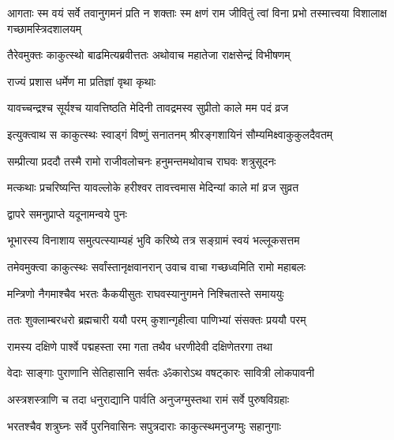 \threelineshloka
{आगताः स्म वयं सर्वे तवानुगमनं प्रति}
{न शक्ताः स्म क्षणं राम जीवितुं त्वां विना प्रभो}
{तस्मात्त्वया विशालाक्ष गच्छामस्त्रिदशालयम्}%


\twolineshloka
{तैरेवमुक्तः काकुत्स्थो बाढमित्यब्रवीत्ततः}
{अथोवाच महातेजा राक्षसेन्द्रं विभीषणम्}%


राज्यं प्रशास धर्मेण मा प्रतिज्ञां वृथा कृथाः

\twolineshloka
{यावच्चन्द्रश्च सूर्यश्च यावत्तिष्ठति मेदिनी}
{तावद्रमस्व सुप्रीतो काले मम पदं व्रज}%


\twolineshloka
{इत्युक्त्वाथ स काकुत्स्थः स्वाड्गं विष्णुं सनातनम्}
{श्रीरङ्गशायिनं सौम्यमिक्ष्वाकुकुलदैवतम्}%

\twolineshloka
{सम्प्रीत्या प्रददौ तस्मै रामो राजीवलोचनः}
{हनुमन्तमथोवाच राघवः शत्रुसूदनः}%


\twolineshloka
{मत्कथाः प्रचरिष्यन्ति यावल्लोके हरीश्वर}
{तावत्त्वमास मेदिन्यां काले मां व्रज सुव्रत}%



\onelineshloka
{द्वापरे समनुप्राप्ते यदूनामन्वये पुनः}%

\twolineshloka
{भूभारस्य विनाशाय समुत्पत्स्याम्यहं भुवि}
{करिष्ये तत्र सङ्ग्रामं स्वयं भल्लूकसत्तम}%


\twolineshloka
{तमेवमुक्त्वा काकुत्स्थः सर्वांस्तानृक्षवानरान्}
{उवाच वाचा गच्छध्वमिति रामो महाबलः}%

\twolineshloka
{मन्त्रिणो नैगमाश्चैव भरतः कैकयीसुतः}
{राघवस्यानुगमने निश्चितास्ते समाययुः}%

\twolineshloka
{ततः शुक्लाम्बरधरो ब्रह्मचारी ययौ परम्}
{कुशान्गृहीत्वा पाणिभ्यां संसक्तः प्रययौ परम्}%

\twolineshloka
{रामस्य दक्षिणे पार्श्वे पद्महस्ता रमा गता}
{तथैव धरणीदेवी दक्षिणेतरगा तथा}%

\twolineshloka
{वेदाः साङ्गाः पुराणानि सेतिहासानि सर्वतः}
{ॐकारोऽथ वषट्कारः सावित्री लोकपावनी}%

\twolineshloka
{अस्त्रशस्त्राणि च तदा धनुराद्यानि पार्वति}
{अनुजग्मुस्तथा रामं सर्वे पुरुषविग्रहाः}%

\twolineshloka
{भरतश्चैव शत्रुघ्नः सर्वे पुरनिवासिनः}
{सपुत्रदाराः काकुत्स्थमनुजग्मुः सहानुगाः}%

